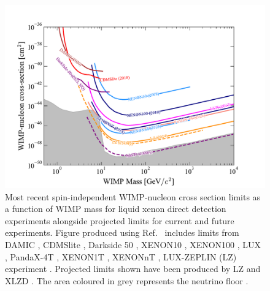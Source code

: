 \begin{figure}[ht!]
    \centering
    \includegraphics[width=\linewidth]{figures/DMOverview/allwimp_limits.pdf}
    \caption[Most recent spin-independent WIMP-nucleon cross section limits as a function of WIMP mass.]{Most recent spin-independent WIMP-nucleon cross section limits as a function of WIMP mass for liquid xenon direct detection experiments alongside projected limits for current and future experiments. Figure produced using Ref.~\cite{DDLimitRepo} includes limits from DAMIC \cite{DAMIC:2020cut}, CDMSlite \cite{SuperCDMS:2017nns}, Darkside 50 \cite{DarkSide:2018bpj}, XENON10 \cite{XENON:2007uwm}, XENON100 \cite{XENON100:2016sjq}, LUX \cite{LUX:2016ggv}, PandaX-4T \cite{PandaX-4T:2021bab}, XENON1T \cite{XENON:2018voc}, XENONnT \cite{XENON:2025vwd}, LUX-ZEPLIN (LZ) experiment \cite{LZCollaboration:2024lux}. Projected limits shown have been produced by LZ \cite{LZ:2018qzl} and XLZD \cite{XLZD:2024nsu}. The area coloured in grey represents the neutrino floor \cite{Billard:2013qya}.}
    \label{fig:DMOverview/WIMPCrossSec.pdf}
\end{figure}
